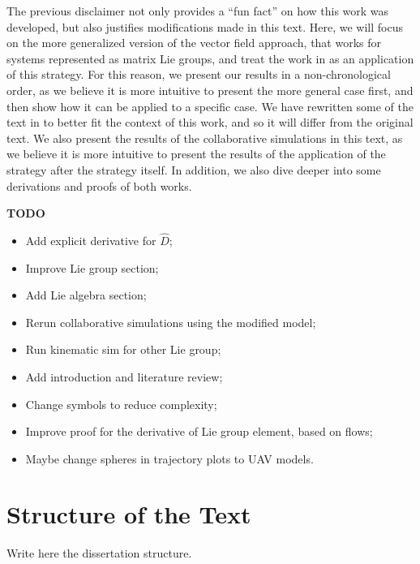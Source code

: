 The previous disclaimer not only provides a ``fun fact'' on how this work was developed, but also justifies modifications made in this text. Here, we will focus on the more generalized version of the vector field approach, that works for systems represented as matrix Lie groups, and treat the work in \citet{Pessoa2024} as an application of this strategy. For this reason, we present our results in a non-chronological order, as we believe it is more intuitive to present the more general case first, and then show how it can be applied to a specific case. We have rewritten some of the text in \citet{Pessoa2024} to better fit the context of this work, and so it will differ from the original text. We also present the results of the collaborative simulations in this text, as we believe it is more intuitive to present the results of the application of the strategy after the strategy itself. In addition, we also dive deeper into some derivations and proofs of both works.

\textbf{TODO}
\begin{itemize}
    \item Add explicit derivative for $\widehat{D}$;
    \item Improve Lie group section;
    \item Add Lie algebra section;
    \item Rerun collaborative simulations using the modified model;
    \item Run kinematic sim for other Lie group;
    \item Add introduction and literature review;
    \item Change symbols to reduce complexity;
    \item Improve proof for the derivative of Lie group element, based on flows;
    \item Maybe change spheres in trajectory plots to UAV models.
\end{itemize}

\section{Structure of the Text}

Write here the dissertation structure.

